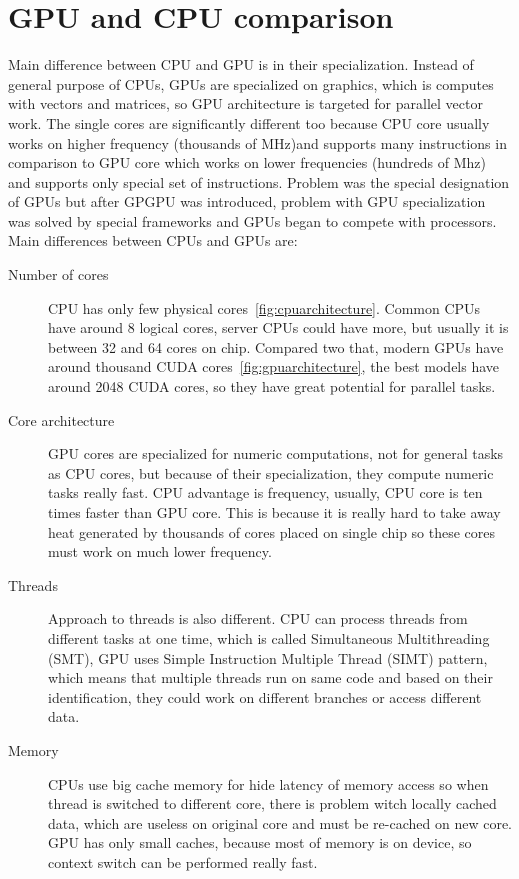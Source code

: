 \section{GPU and CPU comparison} \label{ssec:gpucpucomparison}
Main difference between CPU and GPU is in their specialization. Instead of general purpose of CPUs, GPUs are specialized on graphics, which is computes with vectors and matrices, so GPU architecture is targeted for parallel vector work. The single cores are significantly different too because CPU core usually works on higher frequency (thousands of MHz)and supports many instructions in comparison to GPU core which works on lower frequencies (hundreds of Mhz) and supports only special set of instructions. Problem was the special designation of GPUs but after GPGPU was introduced, problem with GPU specialization was solved by special frameworks and GPUs began to compete with processors. Main differences between CPUs and GPUs are:
\begin{description}
\item[Number of cores] CPU has only few physical cores~\autoref{fig:cpuarchitecture}. Common CPUs have around 8 logical cores, server CPUs could have more, but usually it is between 32 and 64 cores on chip. Compared two that, modern GPUs have around thousand CUDA cores~\autoref{fig:gpuarchitecture}, the best models have around 2048 CUDA cores, so they have great potential for parallel tasks.
\item[Core architecture] GPU cores are specialized for numeric computations, not for general tasks as CPU cores, but because of their specialization, they compute numeric tasks really fast. CPU advantage is frequency, usually, CPU core is ten times faster than GPU core. This is because it is really hard to take away heat generated by thousands of cores placed on single chip so these cores must work on much lower frequency.
\item[Threads] Approach to threads is also different. CPU can process threads from different tasks at one time, which is called Simultaneous Multithreading (SMT), GPU uses Simple Instruction Multiple Thread (SIMT) pattern, which means that multiple threads run on same code and based on their identification, they could work on different branches or access different data.
\item[Memory] CPUs use big cache memory for hide latency of memory access so when thread is switched to different core, there is problem witch locally cached data, which are useless on original core and must be re-cached on new core. GPU has only small caches, because most of memory is on device, so context switch can be performed really fast.
\end{description}

